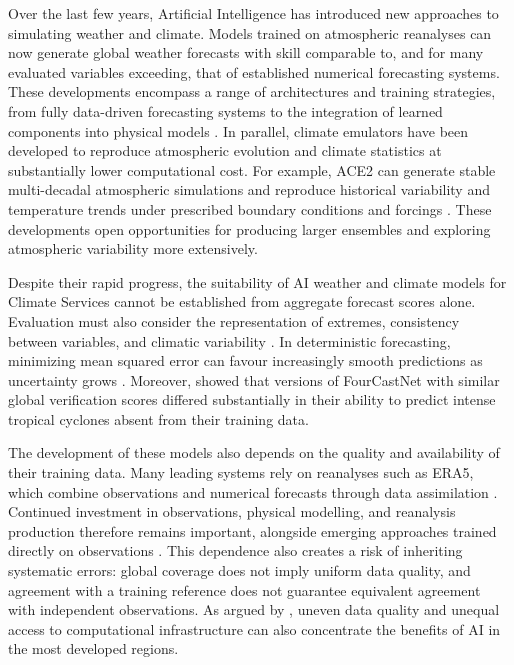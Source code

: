 Over the last few years, Artificial Intelligence has introduced new approaches to simulating weather and climate. Models trained on atmospheric reanalyses can now generate global weather forecasts with skill comparable to, and for many evaluated variables exceeding, that of established numerical forecasting systems. These developments encompass a range of architectures and training strategies, from fully data-driven forecasting systems to the integration of learned components into physical models \citep{de_burgh-day_machine_2023}. In parallel, climate emulators have been developed to reproduce atmospheric evolution and climate statistics at substantially lower computational cost. For example, ACE2 can generate stable multi-decadal atmospheric simulations and reproduce historical variability and temperature trends under prescribed boundary conditions and forcings \citep{watt-meyer_ace2_2025}. These developments open opportunities for producing larger ensembles and exploring atmospheric variability more extensively. 

Despite their rapid progress, the suitability of AI weather and climate models for Climate Services cannot be established from aggregate forecast scores alone. Evaluation must also consider the representation of extremes, consistency between variables, and climatic variability \citep{schultz_can_2021}. In deterministic forecasting, minimizing mean squared error can favour increasingly smooth predictions as uncertainty grows \citep{lang_aifs-crps_2026}. Moreover, \citet{sun_can_2025} showed that versions of FourCastNet with similar global verification scores differed substantially in their ability to predict intense tropical cyclones absent from their training data.

The development of these models also depends on the quality and availability of their training data. Many leading systems rely on reanalyses such as ERA5, which combine observations and numerical forecasts through data assimilation \citep{hersbach_era5_2020}. Continued investment in observations, physical modelling, and reanalysis production therefore remains important, alongside emerging approaches trained directly on observations \citep{mcnally_data_2024}. This dependence also creates a risk of inheriting systematic errors: global coverage does not imply uniform data quality, and agreement with a training reference does not guarantee equivalent agreement with independent observations. As argued by \citet{mozaffari_rise_2026}, uneven data quality and unequal access to computational infrastructure can also concentrate the benefits of AI in the most developed regions. 

